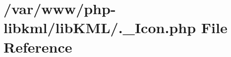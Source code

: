 \hypertarget{_8__Icon_8php}{
\section{/var/www/php-\/libkml/libKML/.\_\-Icon.php File Reference}
\label{db/d3e/_8__Icon_8php}
}
